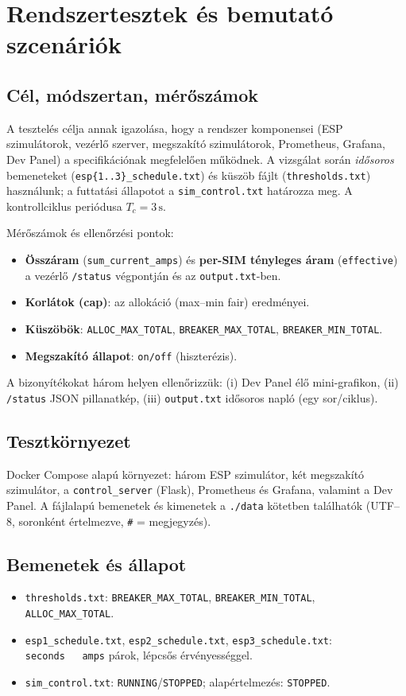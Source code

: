 \chapter{Rendszertesztek és bemutató szcenáriók}

\section{Cél, módszertan, mérőszámok}
A tesztelés célja annak igazolása, hogy a rendszer komponensei (ESP szimulátorok, vezérlő szerver, megszakító szimulátorok, Prometheus, Grafana, Dev Panel) a specifikációnak megfelelően működnek. A vizsgálat során \emph{idősoros} bemeneteket (\texttt{esp\{1..3\}\_schedule.txt}) és küszöb fájlt (\texttt{thresholds.txt}) használunk; a futtatási állapotot a \texttt{sim\_control.txt} határozza meg. A kontrollciklus periódusa \(T_c=3\,\mathrm{s}\).

Mérőszámok és ellenőrzési pontok:
\begin{itemize}
  \item \textbf{Összáram} (\texttt{sum\_current\_amps}) és \textbf{per-SIM tényleges áram} (\texttt{effective}) a vezérlő \texttt{/status} végpontján és az \texttt{output.txt}-ben.
  \item \textbf{Korlátok (cap)}: az allokáció (max--min fair) eredményei.
  \item \textbf{Küszöbök}: \texttt{ALLOC\_MAX\_TOTAL}, \texttt{BREAKER\_MAX\_TOTAL}, \texttt{BREAKER\_MIN\_TOTAL}.
  \item \textbf{Megszakító állapot}: \texttt{on/off} (hiszterézis).
\end{itemize}

A bizonyítékokat három helyen ellenőrizzük: (i) Dev Panel élő mini-grafikon, (ii) \texttt{/status} JSON pillanatkép, (iii) \texttt{output.txt} idősoros napló (egy sor/ciklus).

\section{Tesztkörnyezet}
Docker Compose alapú környezet: három ESP szimulátor, két megszakító szimulátor, a \texttt{control\_server} (Flask), Prometheus és Grafana, valamint a Dev Panel. A fájlalapú bemenetek és kimenetek a \texttt{./data} kötetben találhatók (UTF--8, soronként értelmezve, \texttt{\#} = megjegyzés).

\section{Bemenetek és állapot}
\begin{itemize}
  \item \texttt{thresholds.txt}: \texttt{BREAKER\_MAX\_TOTAL}, \texttt{BREAKER\_MIN\_TOTAL}, \texttt{ALLOC\_MAX\_TOTAL}.
  \item \texttt{esp1\_schedule.txt}, \texttt{esp2\_schedule.txt}, \texttt{esp3\_schedule.txt}: \texttt{seconds\ \ \ amps} párok, lépcsős érvényességgel.
  \item \texttt{sim\_control.txt}: \texttt{RUNNING}/\texttt{STOPPED}; alapértelmezés: \texttt{STOPPED}.
\end{itemize}

